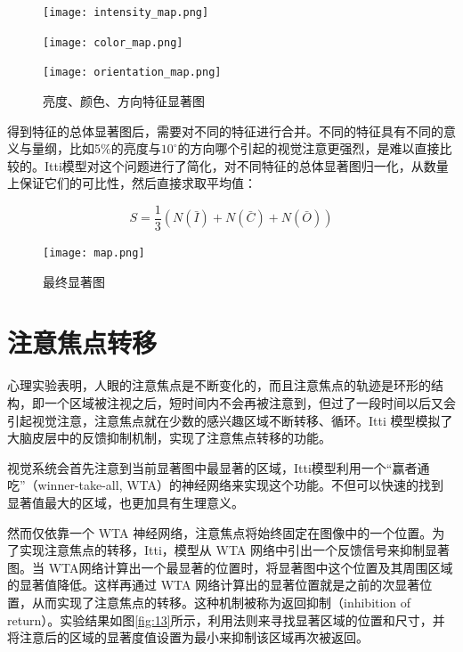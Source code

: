 \documentclass[a4paper,10pt]{article}\large
\begin{document}
\begin{figure}[!ht]
\begin{minipage}[c]{0.31\textwidth}
\centering
\texttt{[image: intensity\_map.png]}
\end{minipage}
\hspace{1ex}
\begin{minipage}[c]{0.31\textwidth}
\centering
\texttt{[image: color\_map.png]}
\end{minipage}
\hspace{1ex}
\begin{minipage}[c]{0.31\textwidth}
\centering
\texttt{[image: orientation\_map.png]}
\end{minipage}
\caption{亮度、颜色、方向特征显著图}\label{fig:11}
\end{figure} 


得到特征的总体显著图后，需要对不同的特征进行合并。不同的特征具有不同的意义与量纲，比如5\%的亮度与$10^\circ$的方向哪个引起的视觉注意更强烈，是难以直接比较的。Itti模型对这个问题进行了简化，对不同特征的总体显著图归一化，从数量上保证它们的可比性，然后直接求取平均值：

\begin{equation}
S=\frac{1}{3}(N(\bar{I})+N(\bar{C})+N(\bar{O}))
\end{equation}

\begin{figure}[!htb]
\centering
\texttt{[image: map.png]}
\caption{最终显著图}
\label{fig:12} 
\end{figure}





\section{注意焦点转移}

心理实验表明，人眼的注意焦点是不断变化的，而且注意焦点的轨迹是环形的结构，即一个区域被注视之后，短时间内不会再被注意到，但过了一段时间以后又会引起视觉注意，注意焦点就在少数的感兴趣区域不断转移、循环。Itti 模型模拟了大脑皮层中的反馈抑制机制，实现了注意焦点转移的功能。


视觉系统会首先注意到当前显著图中最显著的区域，Itti模型利用一个“赢者通吃”（winner-take-all, WTA）的神经网络来实现这个功能。不但可以快速的找到显著值最大的区域，也更加具有生理意义。


然而仅依靠一个 WTA 神经网络，注意焦点将始终固定在图像中的一个位置。为了实现注意焦点的转移，Itti，模型从 WTA 网络中引出一个反馈信号来抑制显著图。当 WTA网络计算出一个最显著的位置时，将显著图中这个位置及其周围区域的显著值降低。这样再通过 WTA 网络计算出的显著位置就是之前的次显著位置，从而实现了注意焦点的转移。这种机制被称为返回抑制（inhibition of return）。实验结果如图\ref{fig:13}所示，利用法则来寻找显著区域的位置和尺寸，并将注意后的区域的显著度值设置为最小来抑制该区域再次被返回。
\end{document}
